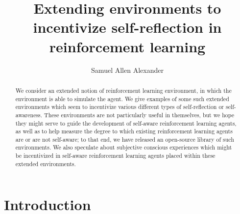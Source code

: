 \documentclass[runningheads]{llncs}
\begin{document}
\title{Extending environments to incentivize self-reflection
in reinforcement learning}

\author{Samuel Allen Alexander}

\maketitle

\begin{abstract}
    We consider an extended notion
    of reinforcement learning environment, in which the environment is able
    to simulate the agent. We give
    examples of some such extended environments which seem to incentivize
    various different types of self-reflection or self-awareness.
    These environments are not particularly useful in themselves, but we
    hope they might serve to guide the development of self-aware reinforcement
    learning agents, as well as to help measure the degree to which existing
    reinforcement learning agents are or are not self-aware; to that end,
    we have released an open-source library of such environments.
    We also speculate
    about subjective conscious experiences which
    might be incentivized in self-aware reinforcement learning agents
    placed within these extended environments.
\end{abstract}

\section{Introduction}
\end{document}
